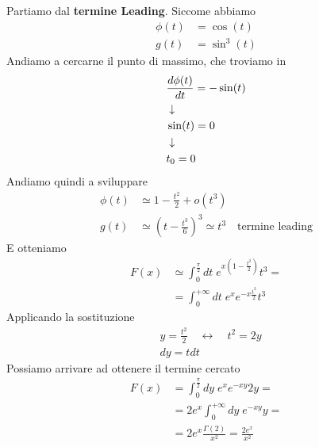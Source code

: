 Partiamo dal \textbf{termine Leading}. Siccome abbiamo
\begin{align}
	\phi(t) &= \cos(t) \\
	g(t) &= \sin^3(t)
\end{align}
Andiamo a cercarne il punto di massimo, che troviamo in
\begin{align}
	&\frac{d \phi(t)}{dt} = -\sin(t) \\ &\downarrow \nonumber \\
	&\sin(t) = 0 \nonumber \\ &\downarrow \nonumber \\
	&t_0=0
\end{align}
Andiamo quindi a sviluppare
\begin{align}
	\phi(t) &\simeq 1- \frac{t^2}{2} + o(t^3)  \\
	g(t) &\simeq \left( t - \frac{t^3}{6} \right)^3 \simeq t^3 \quad \text{termine leading}
\end{align}
E otteniamo
\begin{align}
	F(x) &\simeq \int_{0}^{\frac{\pi}{2}} dt \; e^{x\left(1- \frac{t^2}{2}\right)}t^3 = \nonumber\\
	&= \int_{0}^{+\infty} dt \; e^x e^{-x\frac{t^2}{2}}t^3
\end{align}
Applicando la sostituzione
\begin{align}
	&y= \frac{t^2}{2} \quad \leftrightarrow \quad t^2 = 2y \\
	&dy = tdt
\end{align}
Possiamo arrivare ad ottenere il termine cercato
\begin{align}
	F(x) &= \int_{0}^{\frac{\pi}{2}} dy \; e^x e^{-xy}2y = \nonumber\\
		 &= 2e^x\int_{0}^{+\infty} dy \;e^{-xy}y = \nonumber\\
		 &= 2e^x \frac{\Gamma(2)}{x^2} = \frac{2e^x}{x^2}
\end{align}

